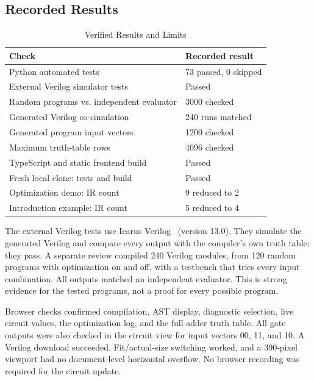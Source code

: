 \documentclass[conference]{IEEEtran}
\begin{document}
\subsection{Recorded Results}
\begin{table}[ht]
\caption{Verified Results and Limits}
\label{tab:results}
\centering\small
\begin{tabular}{@{}P{0.57\columnwidth}P{0.36\columnwidth}@{}}
\toprule Check & Recorded result\\\midrule
Python automated tests & 73 passed, 0 skipped\\
External Verilog simulator tests & Passed\\
Random programs vs. independent evaluator & 3000 checked\\
Generated Verilog co-simulation & 240 runs matched\\
Generated program input vectors & 1200 checked\\
Maximum truth-table rows & 4096 checked\\
TypeScript and static frontend build & Passed\\
Fresh local clone: tests and build & Passed\\
Optimization demo: IR count & 9 reduced to 2\\
Introduction example: IR count & 5 reduced to 4\\\bottomrule
\end{tabular}
\end{table}
The external Verilog tests use Icarus Verilog~\cite{icarus} (version 13.0). They simulate the generated Verilog and compare every output with the compiler's own truth table; they pass. A separate review compiled 240 Verilog modules, from 120 random programs with optimization on and off, with a testbench that tries every input combination. All outputs matched an independent evaluator. This is strong evidence for the tested programs, not a proof for every possible program.

Browser checks confirmed compilation, AST display, diagnostic selection, live circuit values, the optimization log, and the full-adder truth table. All gate outputs were also checked in the circuit view for input vectors 00, 11, and 10. A Verilog download succeeded. Fit/actual-size switching worked, and a 390-pixel viewport had no document-level horizontal overflow. No browser recording was required for the circuit update.
\end{document}
